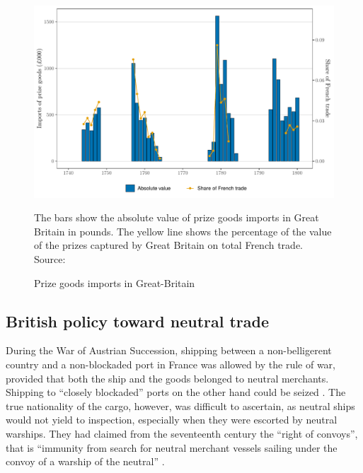 \documentclass[12pt,a4paper,notitlepage,english]{article}
\newcommand{\fontsmall}{\fontsize{10pt}{12pt}\selectfont}
\begin{document}
\begin{appendix}
\begin{figure}[h!]
	\caption{Prize goods imports in Great-Britain}
	\label{Prize goods imports}
	\centering
	\includegraphics[scale=0.2]{Prizes_imports}
	\begin{minipage}{18cm}
		\begin{flushleft}
			\fontsmall 
			The bars show the absolute value of prize goods imports in Great Britain in pounds. The yellow line shows the percentage of the value of the prizes captured by Great Britain on total French trade. Source: 
			\cite{Ashton1960}
		\end{flushleft}
	\end{minipage}
\end{figure}


\subsection{British policy toward neutral trade}\label{app:appendix_neutral_policy}

During the War of Austrian Succession, shipping between a non-belligerent country and a non-blockaded port in France was allowed by the rule of war, provided that both the ship and the goods belonged to neutral merchants.
Shipping to ``closely blockaded'' ports on the other hand could be seized \citep[p. 112]{Schnakenbourg2013}.
The true nationality of the cargo, however, was difficult to ascertain, as neutral ships would not yield to inspection, especially when they were escorted by neutral warships.
They had claimed from the seventeenth century the ``right of convoys'', that is ``immunity from search for neutral merchant vessels sailing under the convoy of a warship of the neutral'' \citep[p. 17]{Davis2006}.


\end{appendix}
\end{document}
